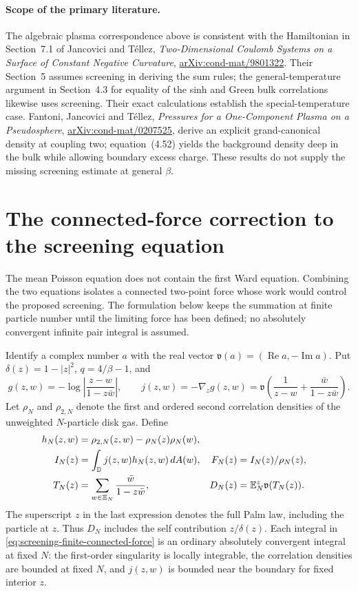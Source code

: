 \documentclass[11pt,a4paper]{article}
\numberwithin{equation}{section}
\theoremstyle{definition}
\theoremstyle{remark}
\newcommand{\D}{\mathbb D}
\begin{document}
\paragraph{Scope of the primary literature.}
The algebraic plasma correspondence above is consistent with the
Hamiltonian in Section~7.1 of Jancovici and T\'ellez,
\emph{Two-Dimensional Coulomb Systems on a Surface of Constant Negative
Curvature}, \href{https://arxiv.org/pdf/cond-mat/9801322}{arXiv:cond-mat/9801322}.
Their Section~5 assumes screening in deriving the sum rules; the
general-temperature argument in Section~4.3 for equality of the sinh
and Green bulk correlations likewise uses screening.  Their exact
calculations establish the special-temperature case.
Fantoni, Jancovici and T\'ellez,
\emph{Pressures for a One-Component Plasma on a Pseudosphere},
\href{https://arxiv.org/pdf/cond-mat/0207525}{arXiv:cond-mat/0207525},
derive an explicit grand-canonical density at coupling two;
equation~(4.52) yields the background density deep in the bulk while
allowing boundary excess charge.  These results do not supply the
missing screening estimate at general $\beta$.


\section{The connected-force correction to the screening equation}
\label{sec:screening-connected-force}

The mean Poisson equation does not contain the first Ward equation.
Combining the two equations isolates a connected two-point force whose
work would control the proposed screening. The formulation below keeps
the summation at finite particle number until the limiting force has
been defined; no absolutely convergent infinite pair integral is assumed.

Identify a complex number $a$ with the real vector
$\mathfrak v(a)=(\operatorname{Re}a,-\operatorname{Im}a)$. Put
$\delta(z)=1-|z|^2$, $q=4/\beta-1$, and
\[
 g(z,w)=-\log\left|\frac{z-w}{1-z\bar w}\right|,
 \qquad
 j(z,w)=-\nabla_zg(z,w)
 =\mathfrak v\left(\frac1{z-w}+\frac{\bar w}{1-z\bar w}\right).
\]
Let $\rho_N$ and $\rho_{2,N}$ denote the first and ordered second
correlation densities of the unweighted $N$-particle disk gas. Define
\begin{align}
 h_N(z,w)&=\rho_{2,N}(z,w)-\rho_N(z)\rho_N(w),\notag\\
 I_N(z)&=\int_\D j(z,w)h_N(z,w)\,dA(w),
 &F_N(z)&=I_N(z)/\rho_N(z),
 \label{eq:screening-finite-connected-force}\\
 T_N(z)&=\sum_{w\in\Xi_N}\frac{\bar w}{1-z\bar w},
 &D_N(z)&=\mathbb E_N^{z}\mathfrak v(T_N(z)).\notag
\end{align}
The superscript $z$ in the last expression denotes the full Palm law,
including the particle at $z$. Thus $D_N$ includes the self contribution
$z/\delta(z)$. Each integral in
\eqref{eq:screening-finite-connected-force} is an ordinary absolutely
convergent integral at fixed $N$: the first-order singularity is locally
integrable, the correlation densities are bounded at fixed $N$, and
$j(z,w)$ is bounded near the boundary for fixed interior $z$.
\end{document}
